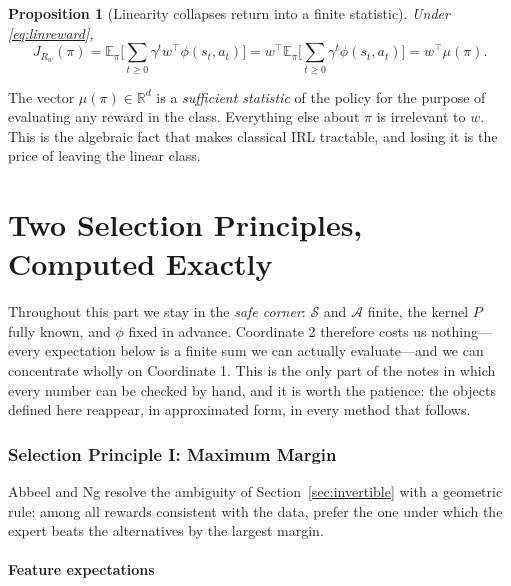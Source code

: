 \documentclass[11pt]{article}
\theoremstyle{plain}
\newtheorem{proposition}[theorem]{Proposition}
\theoremstyle{definition}
\theoremstyle{remark}
\renewcommand{\S}{\mathcal{S}}
\newcommand{\A}{\mathcal{A}}
\newcommand{\E}{\mathbb{E}}
\newcommand{\R}{\mathbb{R}}
\begin{document}
\begin{proposition}[Linearity collapses return into a finite statistic]
Under \eqref{eq:linreward},
\begin{equation}
J_{R_w}(\pi) = \E_\pi\Big[\sum_{t\ge0}\gamma^t w^\top\phi(s_t,a_t)\Big]
= w^\top \E_\pi\Big[\sum_{t\ge0}\gamma^t \phi(s_t,a_t)\Big] = w^\top \mu(\pi).
\label{eq:linreturn}
\end{equation}
\end{proposition}

The vector $\mu(\pi)\in\R^d$ is a \emph{sufficient statistic} of the
policy for the purpose of evaluating any reward in the class. Everything
else about $\pi$ is irrelevant to $w$. This is the algebraic fact that
makes classical IRL tractable, and losing it is the price of leaving the
linear class.

\clearpage
\part{Two Selection Principles, Computed Exactly}\label{part:selection}

Throughout this part we stay in the \emph{safe corner}: $\S$ and $\A$
finite, the kernel $P$ fully known, and $\phi$ fixed in advance.
Coordinate 2 therefore costs us nothing---every expectation below is a
finite sum we can actually evaluate---and we can concentrate wholly on
Coordinate 1. This is the only part of the notes in which every number can
be checked by hand, and it is worth the patience: the objects defined here
reappear, in approximated form, in every method that follows.

\section{Selection Principle I: Maximum Margin}
\label{sec:selectionprinc1}

Abbeel and Ng \cite{abbeelng2004} resolve the ambiguity of
Section~\ref{sec:invertible} with a geometric rule: among all rewards
consistent with the data, prefer the one under which the expert beats the
alternatives by the largest margin.

\subsection{Feature expectations}
\end{document}
